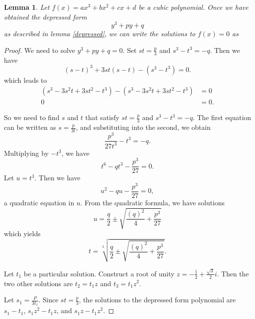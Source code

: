 \documentclass[12pt]{amsart}
\newtheorem{lem}{Lemma}
\theoremstyle{case}
\begin{document}
	\begin{lem}
		Let $f(x) = ax^3 + bx^2 + cx + d$ be a cubic polynomial. Once we have obtained the depressed form $$ y^3 + py + q $$ as described in lemma \ref{depressed}, we can write the solutions to $f(x) = 0$ as
	\end{lem}

	\begin{proof}
		We need to solve $y^3 + py + q = 0$. Set $st = \frac{p}{3}$ and $s^3 - t^3 = -q$. Then we have
		$$ (s-t)^3 + 3st(s-t) - (s^3 - t^3) = 0 . $$
		which leads to
		\begin{equation*}
		\begin{split} (s^3 - 3s^2t + 3st^2 - t^3) - (s^3 - 3s^2t + 3st^2 - t^3) & = 0 \\
		0 & = 0.
		\end{split}
		\end{equation*}
		
		So we need to find $s$ and $t$ that satisfy $st = \frac{p}{3}$ and $s^3 - t^3 = -q$. The first equation can be written as $s = \frac{p}{3t}$, and substituting into the second, we obtain
		$$ \frac{p^3}{27t^3} - t^3 = -q . $$
		Multiplying by $-t^3$, we have
		$$ t^6 - qt^3 - \frac{p^3}{27} = 0 . $$
		Let $u = t^3$. Then we have
		$$u^2 - qu - \frac{p^3}{27} = 0 , $$
		a quadratic equation in $u$. From the quadratic formula, we have solutions 
		$$u = \frac{q}{2} \pm \sqrt{\frac{(q)^2}{4} + \frac{p^3}{27}} $$
		which yields
		$$t = \sqrt[3]{\frac{q}{2} \pm \sqrt{\frac{(q)^2}{4} + \frac{p^3}{27}}} . $$
		
		Let $t_1$ be a particular solution. Construct a root of unity $z = - \frac{1}{2} + \frac{\sqrt{3}}{2}i$. Then the two other solutions are $t_2 = t_1 z$ and $t_3 = t_1 z^2$.
		
		Let $s_1 = \frac{P}{3t_1}$. Since $st = \frac{p}{3}$, the solutions to the depressed form polynomial are $s_1 - t_1$, $s_1 z^2 - t_1 z$, and $s_1 z - t_1 z^2$.
		
		
	
	\end{proof}
	
	
	
	
	
\end{document}
